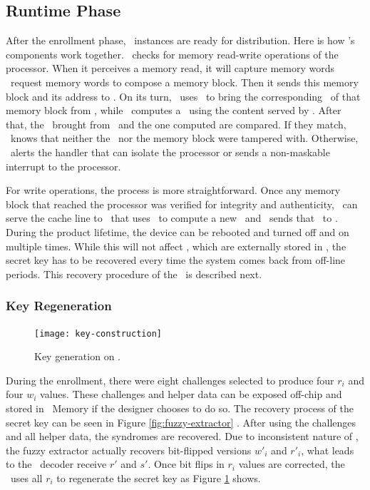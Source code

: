 \subsection{Runtime Phase}
\label{subsec:runtimephase}
\def\fenroll{Figure \ref{fig:fuzzy-extractor} \subref{fig:fuzzy-enroll}}
\def\fregen{Figure \ref{fig:fuzzy-extractor} \subref{fig:fuzzy-regen}}
After the enrollment phase, \cshia~instances are ready for distribution. Here is how \cshia's components work together. \handler~checks for memory read-write operations of the processor. When it perceives a memory read, it will capture memory words \andor~request memory words to compose a memory block. Then it sends this memory block and its address to \seceng. On its turn, \seceng~uses \pmmu~to bring the corresponding \ptag~of that memory block from \ptagmem, while \ptaggen~computes a \ptag~using the content served by \handler. After that, the \ptag~brought from \ptagmem~and the one computed are compared. If they match, \seceng~knows that neither the \ptag~nor the memory block were tampered with. Otherwise, \seceng~alerts the handler that can isolate the processor or sends a non-maskable interrupt to the processor.


For write operations, the process is more straightforward. Once any memory block that reached the processor was verified for integrity and authenticity, \handler~can serve the cache line to \seceng~that uses \ptaggen~to compute a new \ptag~and \pmmu~sends that \ptag~to \ptagmem.  During the product lifetime, the device can be rebooted and turned off and on multiple times. While this will not affect \ptags, which are externally stored in \ptagmem, the secret key has to be recovered every time the system comes back from off-line periods. This recovery procedure of the \fuzzy~is described next.

\subsubsection{Key Regeneration}
\label{subsubsec:Key-Regenation}
\begin{figure}[!t]
    \centering
    \texttt{[image: key-construction]}
    \caption{Key generation on \cshia.}
    \label{fig:key-construction}
\end{figure}

During the enrollment, there were eight challenges selected to produce four $r_i$ and four $w_i$ values. These challenges and helper data can be exposed off-chip and stored in \ptag~Memory if the designer chooses to do so. The recovery process of the secret key can be seen in \fregen. After using the challenges and all helper data, the syndromes are recovered. Due to inconsistent nature of \pufs, the fuzzy extractor actually recovers bit-flipped versions $w'_i$ and $r'_i$, what leads to the \bch~decoder receive $r'$ and $s'$. Once bit flips in $r_i$ values are corrected, the \fe~uses all $r_i$ to regenerate the secret key as Figure \ref{fig:key-construction} shows.

